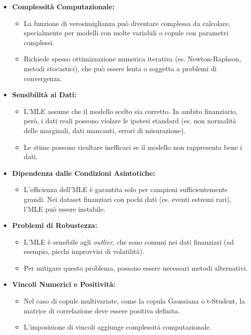 \documentclass[%
	corpo=11pt,
    twoside,
    stile=classica,
    oldstyle,
    tipotesi=custom,
    greek,
    evenboxes,
]{toptesi}
\begin{document}
\begin{itemize}
	\item \textbf{Complessità Computazionale:}
	\begin{itemize}
		\item La funzione di verosimiglianza può diventare complessa da calcolare, specialmente per modelli con molte variabili o copule con parametri complessi.
		\item Richiede spesso ottimizzazione numerica iterativa (es. Newton-Raphson, metodi stocastici), che può essere lenta o soggetta a problemi di convergenza.
	\end{itemize}
	
	\item \textbf{Sensibilità ai Dati:}
	\begin{itemize}
		\item L'MLE assume che il modello scelto sia corretto. In ambito finanziario, però, i dati reali possono violare le ipotesi standard (es. non normalità delle marginali, dati mancanti, errori di misurazione).
		\item Le stime possono risultare inefficaci se il modello non rappresenta bene i dati.
	\end{itemize}
	
	\item \textbf{Dipendenza dalle Condizioni Asintotiche:}
	\begin{itemize}
		\item L'efficienza dell'MLE è garantita solo per campioni sufficientemente grandi. Nei dataset finanziari con pochi dati (es. eventi estremi rari), l'MLE può essere instabile.
	\end{itemize}
	
	\item \textbf{Problemi di Robustezza:}
	\begin{itemize}
		\item L'MLE è sensibile agli \textit{outlier}, che sono comuni nei dati finanziari (ad esempio, picchi improvvisi di volatilità).
		\item Per mitigare questo problema, possono essere necessari metodi alternativi.
	\end{itemize}
	
	\item \textbf{Vincoli Numerici e Positività:}
	\begin{itemize}
		\item Nel caso di copule multivariate, come la copula Gaussiana o t-Student, la matrice di correlazione deve essere positiva definita. 
		\item L'imposizione di vincoli aggiunge complessità computazionale.
	\end{itemize}
\end{itemize}
\end{document}
